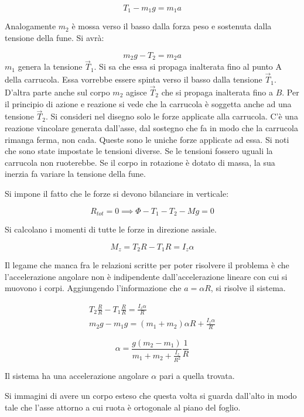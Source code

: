 \[
	T_1 - m_1 g = m_1 a
\]

Analogamente $m_2$ è mossa verso il basso dalla forza peso e sostenuta dalla tensione della fune. Si avrà:

\[
	m_2 g - T_2 = m_2 a
\]
$m_1$ genera la tensione $\vec{T}_1$. Si sa che essa si propaga inalterata fino al punto A della carrucola. Essa vorrebbe essere spinta verso il basso dalla tensione $\vec{T}_1$. D'altra parte anche sul corpo $m_2$ agisce $\vec{T}_2$ che si propaga inalterata fino a $B$. Per il principio di azione e reazione si vede che la carrucola è soggetta anche ad una tensione $\vec{T}_2$. Si consideri nel disegno solo le forze applicate alla carrucola. C'è una reazione vincolare generata dall'asse, dal sostegno che fa in modo che la carrucola rimanga ferma, non cada. Queste sono le uniche forze applicate ad essa. Si noti che sono state impostate le tensioni diverse. Se le tensioni fossero uguali la carrucola non ruoterebbe. Se il corpo in rotazione è dotato di massa, la sua inerzia fa variare la tensione della fune.

Si impone il fatto che le forze si devono bilanciare in verticale:

\[
	R_{tot} = 0 \implies \Phi - T_1 - T_2 - Mg = 0
\]

Si calcolano i momenti di tutte le forze in direzione assiale.

\[
	M_z = T_2 R - T_1 R = I_z\alpha
\]

Il legame che manca fra le relazioni scritte per poter risolvere il problema è che l'accelerazione angolare non è indipendente dall'accelerazione lineare con cui si muovono i corpi. Aggiungendo l'informazione che $a=\alpha R$, si risolve il sistema.

\begin{gather*}
	T_2\frac{R}{R} - T_1 \frac{R}{R} =  \frac{I_z \alpha  }{R} \\
	m_2 g - m_1 g = (m_1+m_2)\alpha R + \frac{I_z\alpha  }{R}
\end{gather*}

\[
	\boxed{\alpha = \frac{g(m_2-m_1)}{m_1+m_2+ \frac{I_z }{R^2}}\frac{1}{R}}
\]

Il sistema ha una accelerazione angolare $\alpha$ pari a quella trovata.

Si immagini di avere un corpo esteso che questa volta si guarda dall'alto in modo tale che l'asse attorno a cui ruota è ortogonale al piano del foglio.

